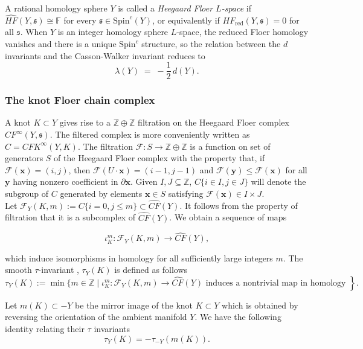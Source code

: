 \documentclass[12pt]{amsart}
\theoremstyle{definition}
\theoremstyle{definition}
\newcommand{\F}{{\mathbb{F}}}
\newcommand{\Z}{{\mathbb{Z}}}
\newcommand{\Spin}{\text{Spin}}
\newcommand{\CF}{\widehat{CF}}
\newcommand{\CFKINFTY}{{CFK}^{\infty}}
\newcommand{\HFhat}{\widehat{HF}}
\newcommand{\din}{d}
\begin{document}
A rational homology sphere $Y$ is called a \emph{Heegaard Floer $L$-space} if $\HFhat(Y,\mathfrak{s}) \cong \F$
for every $\mathfrak{s} \in {\Spin}^c(Y)$, or equivalently if
$HF_{\mathrm{red}}(Y,\mathfrak{s}) = 0$ for all $\mathfrak{s}$. When $Y$ is an integer homology sphere $L$-space, the reduced Floer homology
vanishes and there is a unique ${\Spin}^c$ structure, so the relation between the $\din$ invariants and the Casson-Walker invariant reduces to
\begin{equation*}
\lambda(Y) \;=\; -\frac{1}{2}\,\din(Y).
\end{equation*}


\subsubsection*{The knot Floer chain complex}

A knot  $K \subset Y$ gives rise to a $\Z \oplus\Z$ filtration on  the Heegaard Floer complex $CF^\infty(Y,\mathfrak{s})$. The filtered complex is more conveniently written as $C=\CFKINFTY(Y,K)$. The filtration $\mathcal{F}:S \to \Z \oplus \Z$ is a function on set of generators $S$ of the Heegaard Floer complex with the property that, if $\mathcal{F}(\mathbf{x})=(i, j)$, then $\mathcal{F}(U \cdot \mathbf{x})=(i-1, j-1)$ and $\mathcal{F}(\mathbf{y}) \leq \mathcal{F}(\mathbf{x})$ for all $\mathbf{y}$ having nonzero coefficient in $\partial \mathbf{x}$. Given $I,J \subseteq \Z$, $C\{i \in I, j \in J \}$ will denote the subgroup of $C$ generated by elements $\mathbf{x} \in S$  satisfying $\mathcal{F} (\mathbf{x}) 
\in I \times J$.\\


Let $\mathcal{F}_Y(K, m):=C\{i=0, j \leq m\} \subset {\CF}(Y)$. It follows from the property of filtration that it is a subcomplex of $\CF(Y)$. We obtain a sequence of maps

\[
\iota_K^m: \mathcal{F}_Y(K, m) \longrightarrow \widehat{C F}(Y),
\]

which induce isomorphisms in homology for all sufficiently large integers $m$. The smooth $\tau$-invariant \cite{OSztau}, $\tau_Y(K)$ is defined as follows
\[ \tau_Y(K):=\min \{m \in \mathbb{Z} \mid 
\left.\iota_K^m: \mathcal{F}_Y(K, m) \rightarrow \widehat{C F}(Y) \text { induces a nontrivial map in homology }\right\}.\]

Let  $m(K) \subset -Y$  be the mirror image of the knot  $K \subset Y$ which is obtained by reversing the orientation of the ambient manifold $Y$. We have the following identity relating their $\tau$ invariants \begin{equation*}
\tau_Y(K)=-\tau_{-Y}(m(K)) .
\end{equation*}
\end{document}
